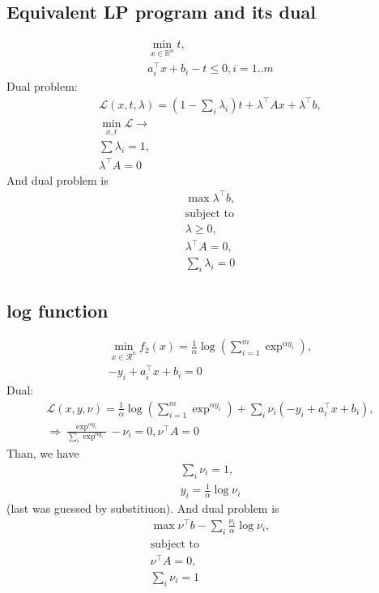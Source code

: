 \documentclass[a4paper,11pt]{scrartcl}
\begin{document}
\subsection{Equivalent LP program and its dual}
\begin{gather*}
\min_{x \in \mathbb{R}^n} t, \\
 a_i^\top x + b_i -t \leq 0 , i=1..m 
\end{gather*}
Dual problem: 
\begin{gather*}
\mathcal{L}\left(x,t,\lambda\right) = \left(1 - \sum_i \lambda_i\right) t +  \lambda^\top A x +  \lambda^\top b,\\
\min_{x,t} \mathcal{L} \rightarrow \\
\sum \lambda_i = 1,\\
\lambda^\top A = 0
\end{gather*}
And dual problem is
\begin{gather*}
\max \lambda^\top b, \\
\text{subject to} \\
\lambda \geq 0, \\
\lambda^\top A = 0, \\
\sum_i \lambda_i = 0
\end{gather*}
\subsection{log function}
\begin{gather*}
\min_{x \in \mathcal{R}^n} f_2(x) = \frac{1}{\alpha}\log\left( \sum_{i=1}^m \exp^{\alpha y_i} \right), \\
-y_i + a_i^\top x + b_i = 0
\end{gather*}
Dual:
\begin{gather*}
\mathcal{L}\left(x,y,\nu\right) = \frac{1}{\alpha}\log\left( \sum_{i=1}^m \exp^{\alpha y_i} \right)  + \sum_i \nu_i \left(- y_i + a_i^\top x + b_i\right),\\ \Rightarrow
\frac{\exp^{\alpha y_i}}{\sum_i \exp^{\alpha y_i}} - \nu_i = 0,
\nu^\top A = 0
\end{gather*}
Than, we have
\begin{gather*}
\sum_i \nu_i = 1, \\
y_i = \frac{1}{\alpha} \log \nu_i
\end{gather*}
(last was guessed by substitiuon). And dual problem is
\begin{gather*}
\max \nu^\top b - \sum_i\frac{\nu_i}{\alpha} \log \nu_i, \\
\text{subject to} \\
\nu^\top A = 0, \\
\sum_i \nu_i = 1
\end{gather*}
\end{document}
